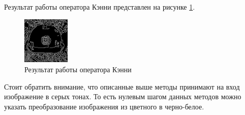 \begin{enumerate}
	Результат работы оператора Кэнни представлен на рисунке \ref{fig:canny_final}.
	
	\begin{figure}[!h]
		\centering
		\includegraphics[width=0.2\textwidth,keepaspectratio]{figures/ru/bmstu_final}
		\caption{Результат работы оператора Кэнни}
		\label{fig:canny_final}
	\end{figure}
\end{enumerate}


Стоит обратить внимание, что описанные выше методы принимают на вход изображение в серых тонах. То есть нулевым шагом данных методов можно указать преобразование изображения из цветного в черно-белое.
